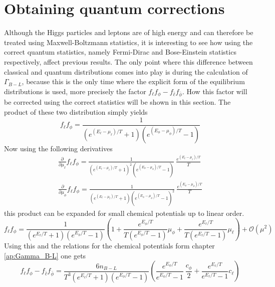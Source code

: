 \section{Obtaining quantum corrections}
Although the Higgs particles and leptons are of high energy and can therefore be treated using Maxwell-Boltzmann statistics, it is interesting to see how using the correct quantum statistics, namely Fermi-Dirac and Bose-Einstein statistics respectively, affect previous results.\newline
The only point where this difference between classical and quantum distributions comes into play is during the calculation of $\Gamma_{B-L}$, because this is the only time where the explicit form of the equilibrium distributions is used, more precisely the factor $f_\ell f_\phi-f_{\bar{\ell}}f_{\bar{\phi}}$. How this factor will be corrected using the correct statistics will be shown in this section. \newline
The product of these two distribution simply yields
\begin{equation*}
	f_\ell f_\phi=\frac{1}{\left(e^{\left(E_\ell-\mu_\ell\right)/T}+1\right)\left(e^{\left(E_\phi-\mu_\phi\right)/T}-1\right)}
\end{equation*}
Now using the following derivatives
\begin{align*}
	\frac{\partial}{\partial\mu_\ell}f_\ell f_\phi=\frac{1}{\left(e^{\left(E_\ell-\mu_\ell\right)/T}+1\right)^2\left(e^{\left(E_\phi-\mu_\phi\right)/T}-1\right)}\:\frac{e^{\left(E_\ell-\mu_\ell\right)/T}}{T}\\
	\frac{\partial}{\partial\mu_\phi}f_\ell f_\phi=\frac{1}{\left(e^{\left(E_\ell-\mu_\ell\right)/T}+1\right)\left(e^{\left(E_\phi-\mu_\phi\right)/T}-1\right)^2}\:\frac{e^{\left(E_\phi-\mu_\phi\right)/T}}{T}
\end{align*}
this product can be expanded for small chemical potentials up to linear order.
\begin{equation*}
	f_\ell f_\phi=\frac{1}{\left(e^{E_\ell/T}+1\right)\left(e^{E_\phi/T}-1\right)}\left(1+\frac{e^{E_\phi/T}}{T\left(e^{E_\phi/T}-1\right)}\mu_\phi+\frac{e^{E_\ell/T}}{T\left(e^{E_\ell/T}-1\right)}\mu_\ell\right)+\mathcal{O}(\mu^2)
\end{equation*}
Using this and the relations for the chemical potentials form chapter \ref{ap:Gamma_B-L} one gets
\begin{equation*}
	f_\ell f_\phi-f_{\bar{\ell}} f_{\bar{\phi}}=\frac{6n_{B-L}}{T^3\left(e^{E_\ell/T}+1\right)\left(e^{E_\phi/T}-1\right)}\left(\frac{e^{E_\phi/T}}{e^{E_\phi/T}-1}\:\frac{c_\phi}{2}+\frac{e^{E_\ell/T}}{e^{E_\ell/T}-1}c_\ell\right)
\end{equation*}
